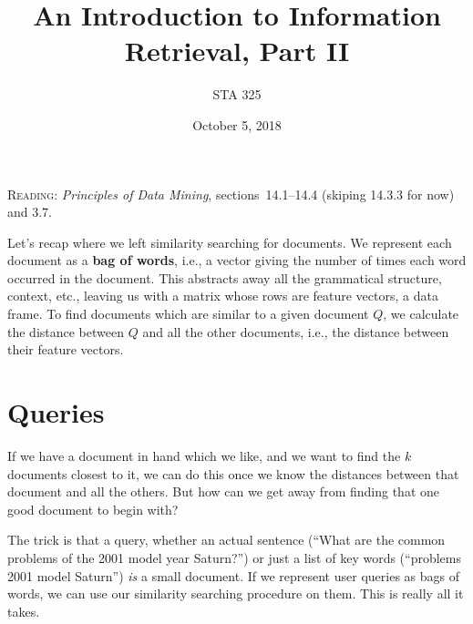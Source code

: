 \documentclass{article}
\begin{document}
\title{An Introduction to Information Retrieval, Part II}
\author{STA 325}
\date{October 5, 2018}
\maketitle

\begin{center}
  \textsc{Reading}: {\em Principles of Data Mining}, sections\ 14.1--14.4
  (skiping 14.3.3 for now) and 3.7.
\end{center}

Let's recap where we left similarity searching for documents.  We represent
each document as a {\bf bag of words}, i.e., a vector giving the number of
times each word occurred in the document.  This abstracts away all the
grammatical structure, context, etc., leaving us with a matrix whose rows are
feature vectors, a data frame.  To find documents which are similar to a given
document $Q$, we calculate the distance between $Q$ and all the other
documents, i.e., the distance between their feature vectors.

\section{Queries}

If we have a document in hand which we like, and we want to find the $k$
documents closest to it, we can do this once we know the distances between that
document and all the others.  But how can we get away from finding that
one good document to begin with?

The trick is that a query, whether an actual sentence (``What are the common
problems of the 2001 model year Saturn?'') or just a list of key words
(``problems 2001 model Saturn'') {\em is} a small document.  If we represent
user queries as bags of words, we can use our similarity searching procedure on
them.  This is really all it takes.
\end{document}
